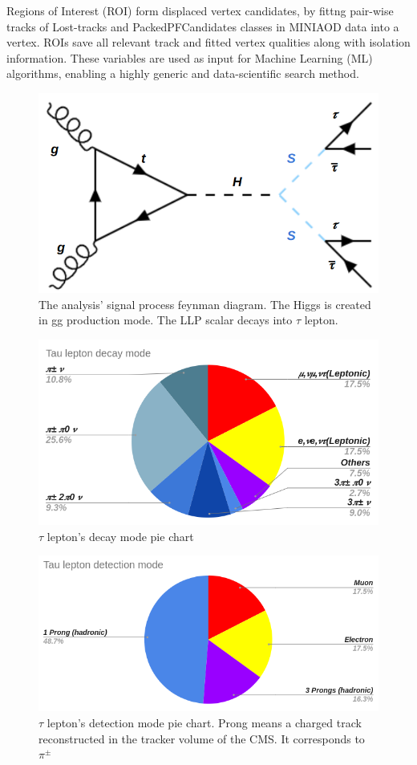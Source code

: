 Regions of Interest (ROI) form displaced vertex candidates, by fittng pair-wise tracks of Lost-tracks and PackedPFCandidates classes in MINIAOD data into a vertex. 
ROIs save all relevant track and fitted vertex qualities along with isolation information.
These variables are used as input for Machine Learning (ML) algorithms, enabling a highly generic and data-scientific search method.
\begin{figure}[h!]
  \caption{The analysis' signal process feynman diagram. The Higgs is created in gg production mode. The LLP scalar decays into $\tau$ lepton.}
  \label{fig:sig}
  \centering
  \includegraphics[width=0.47\linewidth]{figs/sigprocess.png}
\end{figure}


\begin{figure}[h!]
  \caption{$\tau$ lepton's decay mode pie chart}
  \label{fig:tdecay}
  \centering
  \includegraphics[width=0.87\linewidth]{figs/Taudec.png}
\end{figure}

\begin{figure}[h!]
	\caption{$\tau$ lepton's detection mode pie chart. Prong means a charged track reconstructed in the tracker volume of the CMS. It corresponds to $\pi^{\pm}$}
  \label{fig:tdet}
  \centering
  \includegraphics[width=0.87\linewidth]{figs/Taudet.png}
\end{figure}





